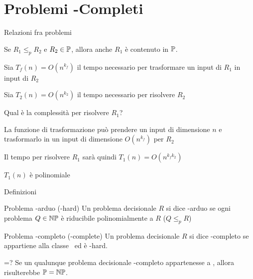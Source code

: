 \section{Problemi \NP-Completi}

\begin{frame}{Relazioni fra problemi}

\vspace{-9pt}
\begin{lemma}
Se $R_1 \leq_p R_2$ e $R_2 \in \mbox{\sc $\mathbb{P}$}$, allora anche
$R_1$ è contenuto in $\mbox{\sc $\mathbb{P}$}$.
\end{lemma}

\BI
\item Sia $T_f(n)=O(n^{k_f})$ il tempo necessario per trasformare un input di $R_1$ in input di $R_2$
\item Sia $T_2(n)=O(n^{k_2})$ il tempo necessario per risolvere $R_2$
\item Qual è la complessità per risolvere $R_1$? 
\EI
\pause\smallskip
\BI
\item La funzione di trasformazione può prendere un input di dimensione
$n$ e trasformarlo in un input di dimensione $O(n^{k_f})$ per $R_2$
\item Il tempo per risolvere $R_1$ sarà quindi $T_1(n) = O(n^{k_f k_2})$
\item $T_1(n)$ è polinomiale
\EI

\end{frame}

\begin{frame}{Definizioni}
    
\vspace{-9pt}
\begin{block}{Problema \NP-arduo (\NP-hard)}
Un problema decisionale $R$ si dice \alert{\NP-arduo} se
ogni problema $Q \in \mbox{$\mathbb{NP}$}$ è riducibile
polinomialmente a $R$ ($Q \leq_p R$)
\end{block}

\bigskip
\begin{block}{Problema \NP-completo (\NP-complete)}
Un problema decisionale $R$ si dice \alert{\NP-completo} se appartiene alla
classe \NP\ ed è \NP-hard.
\end{block}

\bigskip
\begin{block}{\PTIME=\NP?}
Se un qualunque problema decisionale \NP-completo appartenesse
a \PTIME, allora risulterebbe $\mbox{\sc $\mathbb{P}$}=\mbox{$\mathbb{NP}$}$.
\end{block}

\end{frame}

